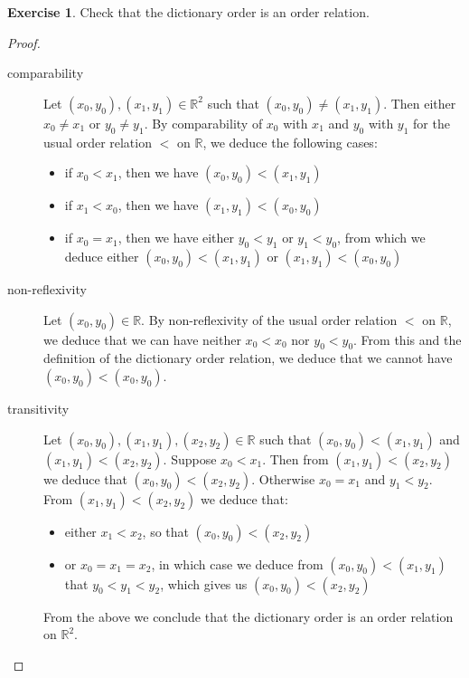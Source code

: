 \documentclass[11pt,a4paper,twoside]{article}
\theoremstyle{definition}
\newcounter{excounter}
\newtheorem{exercise}[excounter]{Exercise}
\begin{document}
\begin{exercise}

  Check that the dictionary order is an order relation.

\end{exercise}

\begin{proof}\hfill

  \begin{description}

  \item [comparability] Let $(x_0, y_0), (x_1, y_1) \in \mathbb{R}^2$ such that $(x_0, y_0) \neq (x_1, y_1)$.
    Then either $x_0 \neq x_1$ or $y_0 \neq y_1$. By comparability of $x_0$ with $x_1$ and $y_0$ with $y_1$ for the usual order relation $<$ on $\mathbb{R}$,
    we deduce the following cases:
    \begin{itemize}

    \item if $x_0 < x_1$, then we have $(x_0, y_0) < (x_1, y_1)$
    \item if $x_1 < x_0$, then we have $(x_1, y_1) < (x_0, y_0)$
    \item if $x_0 = x_1$, then we have either $y_0 < y_1$ or $y_1 < y_0$, from which we deduce either $(x_0, y_0) < (x_1, y_1)$ or $(x_1, y_1) < (x_0, y_0)$

    \end{itemize}

  \item [non-reflexivity] Let $(x_0, y_0) \in \mathbb{R}$.
    By non-reflexivity of the usual order relation $<$ on $\mathbb{R}$, we deduce that we can have neither $x_0 < x_0$ nor $y_0 < y_0$.
    From this and the definition of the dictionary order relation, we deduce that we cannot have $(x_0, y_0) < (x_0, y_0)$.

  \item [transitivity] Let $(x_0, y_0), (x_1, y_1), (x_2, y_2) \in \mathbb{R}$ such that $(x_0, y_0) < (x_1, y_1)$ and $(x_1, y_1) < (x_2, y_2)$.
    Suppose $x_0 < x_1$. Then from $(x_1, y_1) < (x_2, y_2)$ we deduce that $(x_0, y_0) < (x_2, y_2)$.
    Otherwise $x_0 = x_1$ and $y_1 < y_2$. From $(x_1, y_1) < (x_2, y_2)$ we deduce that:
    \begin{itemize}
    \item either $x_1 < x_2$, so that $(x_0, y_0) < (x_2, y_2)$
    \item or $x_0 = x_1 = x_2$, in which case we deduce from $(x_0, y_0) < (x_1, y_1)$ that $y_0 < y_1 < y_2$, which gives us $(x_0, y_0) < (x_2, y_2)$
    \end{itemize}

    From the above we conclude that the dictionary order is an order relation on $\mathbb{R}^2$.

  \end{description}

\end{proof}
\end{document}
